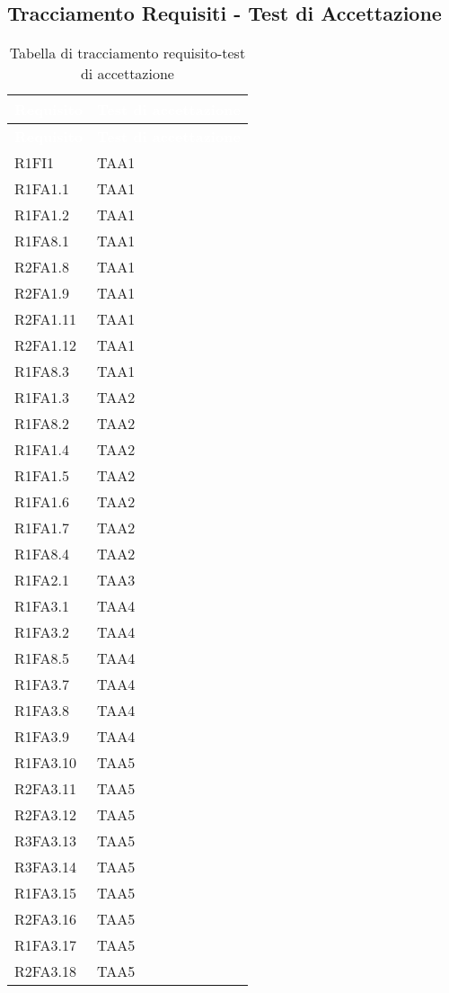 \subsection{Tracciamento Requisiti - Test di Accettazione}
{
\renewcommand{\arraystretch}{1.5}
\centering
\begin{longtable}{C{4cm} C{4cm}}
\caption{Tabella di tracciamento requisito-test di accettazione}\\
\textcolor{white}{\textbf{Requisito}} & \textcolor{white}{\textbf{Test di accettazione}}\\	
\endfirsthead
{}
\textcolor{white}{\textbf{Requisito}} & \textcolor{white}{\textbf{Test di accettazione}}\\	
\endhead

R1FI1 & TAA1  \\
R1FA1.1 & TAA1  \\
R1FA1.2 & TAA1  \\
R1FA8.1 & TAA1  \\
R2FA1.8 & TAA1  \\
R2FA1.9 & TAA1  \\
R2FA1.11 & TAA1  \\ 
R2FA1.12 & TAA1  \\ 
R1FA8.3 & TAA1  \\

R1FA1.3 & TAA2  \\
R1FA8.2 & TAA2  \\
R1FA1.4 & TAA2  \\
R1FA1.5 & TAA2  \\
R1FA1.6 & TAA2  \\
R1FA1.7 & TAA2  \\
R1FA8.4 & TAA2  \\

R1FA2.1 & TAA3  \\

R1FA3.1 & TAA4  \\
R1FA3.2 & TAA4  \\
R1FA8.5 & TAA4  \\
R1FA3.7 & TAA4  \\
R1FA3.8 & TAA4  \\
R1FA3.9 & TAA4  \\

R1FA3.10 & TAA5  \\
R2FA3.11 & TAA5  \\
R2FA3.12 & TAA5  \\
R3FA3.13 & TAA5  \\
R3FA3.14 & TAA5  \\
R1FA3.15 & TAA5  \\
R2FA3.16 & TAA5  \\
R1FA3.17 & TAA5  \\
R2FA3.18 & TAA5  \\


\end{longtable}}

